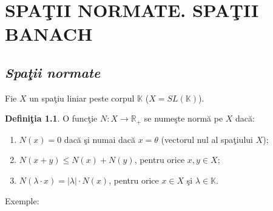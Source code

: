\documentclass[ a4paper, 12pt]{report}
\theoremstyle{definition}
\newtheorem{definition}{\bf Defini\c tia}[section]
\theoremstyle{remark}
\numberwithin{equation}{section}
\begin{document}
\chapter{SPA\c TII NORMATE. SPA\c TII BANACH}
\section{\textit{Spa\c tii normate}}
Fie $X$ un spa\c tiu liniar peste corpul $\mathbb{K}$ ($X= SL(\mathbb{K})$).
\begin{definition}
O func\c tie $N : X \rightarrow \mathbb{R}_{+}$ se nume\c ste norm\u a pe $X$ dac\u a:
\begin{enumerate}[($n_1$)]
\item $N(x) = 0$ dac\u a \c si numai dac\u a $x = \theta$ (vectorul nul al spa\c tiului $X$);
\item $N(x + y) \leq N(x) + N(y)$, pentru orice $x,y \in X$;
\item $N(\lambda \cdot x) = \lvert \lambda\rvert \cdot N(x)$, pentru orice $x \in X$ \c si $\lambda \in \mathbb{K}$.
\end{enumerate}
\end{definition}
Exemple:
\end{document}
